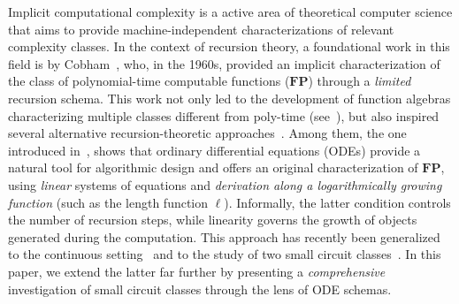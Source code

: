 \documentclass[11pt, oneside]{article}
\newcommand{\FP}{\mathbf{FP}}
\theoremstyle{definition}
\begin{document}
Implicit computational complexity is a active area of theoretical computer science that aims to provide machine-independent characterizations of relevant complexity classes.
%
In the context of recursion theory, a foundational work in this field is by Cobham~\cite{Cobham}, who, in the 1960s, provided an implicit characterization of the class of polynomial-time computable functions ($\FP$) through a \emph{limited} recursion schema.
%
This work not only led to the development of function algebras characterizing multiple classes different from poly-time (see~\cite{CloteKranakis}), but also inspired several alternative recursion-theoretic approaches~\cite{BellantoniCook,Leivant,LeivantMarion93}.
%
Among them, the one introduced in~\cite{BournezDurand19}, shows that ordinary differential equations (ODEs) provide a natural tool for algorithmic design and offers an original characterization of $\FP$, using \emph{linear} systems of equations and \emph{derivation along a logarithmically growing function} (such as the length function $\ell$).
%
Informally, the latter condition controls the number of recursion steps, while linearity governs the growth of objects generated during the computation.
%
This approach has recently been generalized to the continuous setting~\cite{BlancBournez23,BlancBournez24} and to the study of two small circuit classes~\cite{ADK24a}.
%
In this paper, we extend the latter far further by presenting a \emph{comprehensive} investigation of small circuit classes through the lens of ODE schemas.
\end{document}
